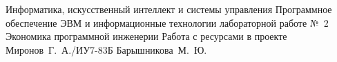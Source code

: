 \documentclass{bmstu}
\begin{document}
\makereporttitle
    {Информатика, искусственный интеллект и системы управления}
    {Программное обеспечение ЭВМ и информационные технологии}
    {лабораторной работе №~2}
    {Экономика программной инженерии}
    {Работа с ресурсами в проекте}
    {}
    {Миронов~Г.~А./ИУ7-83Б}
    {Барышникова~М.~Ю.}






\end{document}
